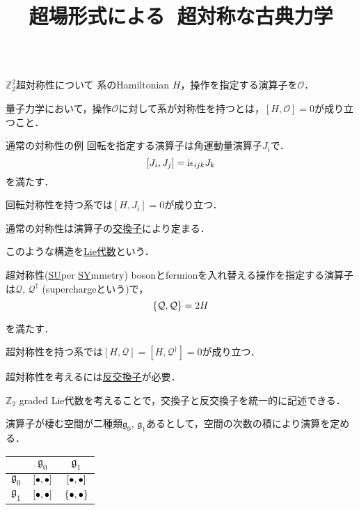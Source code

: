 \documentclass[dvipdfmx]{beamer}
\author{\inst{1}}
\institute{\inst{1}大阪公理}
\title[\textcolor{white}{}]{超場形式による$\textcolor{white}{\mathbf{\Ztt}}$超対称な古典力学}
\newcommand{\Z}{\mathbb{Z}}
\newcommand{\new}{\vspace{0.5\baselineskip}}
\newcommand{\Ztt}{\mathbb{Z}_2^2}
\renewcommand{\i}{\mathrm{i}}
\newcommand{\Q}{\mathcal{Q}}
\newcommand{\g}{\mathfrak{g}}
\begin{document}
\begin{frame}
\begin{columns}[t]
		\begin{column}{0.47\textwidth}
				\begin{block}{$\Ztt$超対称性について}
							系のHamiltonian $H$，操作を指定する演算子を$\mathcal{O}$．

							量子力学において，操作$\mathcal{O}$に対して系が対称性を持つとは，$[H, \mathcal{O}] = 0$が成り立つこと．
					\begin{itembox}[l]{通常の対称性の例}
							回転を指定する演算子は角運動量演算子$J_i$で．
							\[\comm{J_i}{J_j} = \i\epsilon_{ijk}J_k\]
							を満たす．

							回転対称性を持つ系では$[H, J_i] = 0$が成り立つ．
					\end{itembox}
					通常の対称性は演算子の\underline{交換子}により定まる．

					このような構造を\underline{Lie代数}という．
					\begin{itembox}[l]{超対称性(\underline{SU}per \underline{SY}mmetry)}
						bosonとfermionを入れ替える操作を指定する演算子は$\Q$, $\Q^\dag$ (superchargeという)で，
						\[\acomm{\Q}{\Q} =2 H\]

						を満たす．

						超対称性を持つ系では$[H, \Q] = [H, \Q^\dag] = 0$が成り立つ．
					\end{itembox}
					超対称性を考えるには\underline{\alert{反}交換子}が必要．
	\new

					\alert{$\Z_2$ graded} Lie代数を考えることで，交換子と\alert{反}交換子を統一的に記述できる．

					演算子が棲む空間が二種類$\g_0$, $\g_1$あるとして，空間の次数の積により演算を定める．
					\begin{table}[h]
						\centering
						\begin{tabular}{c|cc}\hline
							 & $\g_0$& $\g_1$\\\hline
							$\g_0$ & $\comm{\bullet}{\bullet}$ & $\comm{\bullet}{\bullet}$\\
							$\g_1$ & $\comm{\bullet}{\bullet}$&$\acomm{\bullet}{\bullet}$\\\hline
						\end{tabular}
					\end{table}


\end{block}
\end{column}
\end{columns}
\end{frame}
\end{document}
